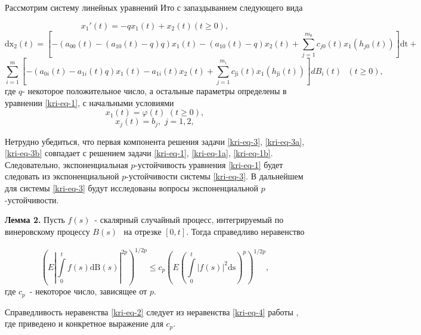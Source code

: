 Рассмотрим систему линейных уравнений Ито с запаздыванием следующего вида

\begin{equation*}
	x_1'(t)=-qx_1(t)+x_2(t)(t\ge 0),
\end{equation*}
\begin{equation}\label{kri-eq-3}
	\text{dx}_2(t)=\left[-(a_{00}(t)-(a_{10}(t)-q)q)x_1(t)-(a_{10}(t)-q)x_2(t)+\overset{m_0}{\underset{j=1}{\sum
	}}c_{\mathit{j0}}(t)x_1(h_{\mathit{j0}}(t))\right]\text{dt}+
\end{equation}
\begin{equation*}
\overset
	m{\underset{i=1}{\sum }}\left[-(a_{0i}(t)-a_{1i}(t)q)x_1(t)-a_{1i}(t)x_2(t)+\overset{m_i}{\underset{j=1}{\sum
	}}c_{\text{ji}}(t)x_1(h_{\text{ji}}(t))\right]\mathit{dB}_i(t)\text{  }(t\ge
	0),
\end{equation*}
где  $q${}- некоторое положительное число, а остальные параметры
определены в уравнении \eqref{kri-eq-1}, с начальными условиями
\begin{equation}\label{kri-eq-3a}
	x_1(t)=\varphi (t)\text{
	}(t\ge
	0),
\end{equation}
\begin{equation}\label{kri-eq-3b}
	x_j(t)=b_j,\text{
	}j=1,2,
\end{equation}

Нетрудно убедиться, что первая компонента решения задачи \eqref{kri-eq-3}, \eqref{kri-eq-3a}, \eqref{kri-eq-3b} совпадает с решением задачи \eqref{kri-eq-1}, \eqref{kri-eq-1a}, \eqref{kri-eq-1b}.
Следовательно, экспоненциальная  $p${}-устойчивость уравнения \eqref{kri-eq-1} будет следовать из экспоненциальной
$p${}-устойчивости системы \eqref{kri-eq-3}. В дальнейшем для системы \eqref{kri-eq-3} будут исследованы вопросы экспоненциальной
$p${}-устойчивости.


\textbf{Лемма 2.} Пусть  $f(s)$\ {}- скалярный случайный процесс, интегрируемый по винеровскому процессу  $B(s)$
\textsubscript{\ }на отрезке  $[0,t]$. Тогда справедливо неравенство

\begin{equation}\label{kri-eq-4}
	\left(E|\overset t{\underset 0{\int }}f(s)\text{dB}(s)|^{2p}\right)^{1/2p}\le
	c_p\left(E\left(\overset t{\underset 0{\int
	}}|f(s)|^2\text{ds}\right)^p\right)^{1/2p},
\end{equation}
где  $c_p$\ {}- некоторое число, зависящее от  $p$.

Справедливость неравенства \eqref{kri-eq-2} следует из неравенства \eqref{kri-eq-4} работы \cite[стр. 65]{kri-bib-18}, где приведено и конкретное выражение для
$c_p$.

